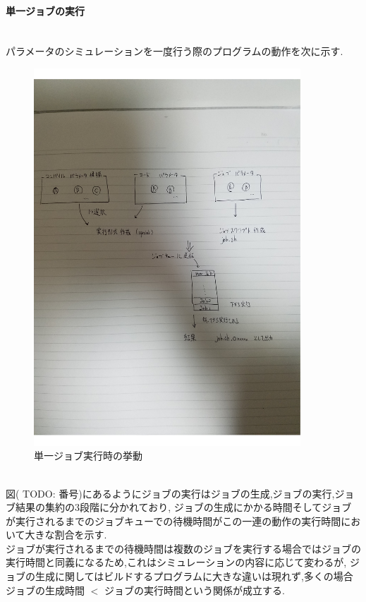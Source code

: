 \paragraph{単一ジョブの実行}~\\
パラメータのシミュレーションを一度行う際のプログラムの動作を次に示す.\\
\begin{figure}[htb]
  \begin{center}
    \includegraphics[width=10.0cm]{./images/singlejob}
    \caption{単一ジョブ実行時の挙動}
    \label{fig:singlejob}
  \end{center}
\end{figure}~\\
図( TODO: 番号)にあるようにジョブの実行はジョブの生成,ジョブの実行,ジョブ結果の集約の3段階に分かれており,
ジョブの生成にかかる時間そしてジョブが実行されるまでのジョブキューでの待機時間がこの一連の動作の実行時間において大きな割合を示す.\\
ジョブが実行されるまでの待機時間は複数のジョブを実行する場合ではジョブの実行時間と同義になるため,これはシミュレーションの内容に応じて変わるが,
ジョブの生成に関してはビルドするプログラムに大きな違いは現れず,多くの場合ジョブの生成時間 $<$ ジョブの実行時間という関係が成立する.\\

